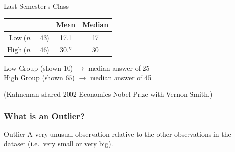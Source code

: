 \documentclass[handout]{beamer}
\begin{document}
\begin{frame}
\begin{block}{Last Semester's Class}
	\begin{table}[h]
		\begin{tabular}{r|cc}
					& Mean & Median\\
					\hline
			Low ($n=43$)& 17.1&17\\
			High ($n=46$)& 30.7&30
		\end{tabular}
	\end{table}
\end{block}
\pause
\begin{block}{\href{http://www.jstor.org/stable/1738360}{}}
Low Group (shown 10) $\rightarrow$ median answer of 25\\
High Group (shown 65) $\rightarrow$ median answer of 45
\end{block}

\vspace{2em}
\alert{ \footnotesize (Kahneman shared 2002 Economics Nobel Prize with Vernon Smith.)}
\end{frame}

\begin{frame}
\frametitle{What is an Outlier?}
	\begin{block}{Outlier}
	A very unusual observation relative to the other observations in the dataset (i.e.\ very small or very big).
\end{block}
\end{frame}
\end{document}
